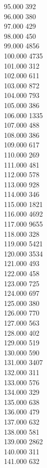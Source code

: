 { 95.000	392 \\
 96.000	380 \\
 97.000	429 \\
 98.000	450 \\
 99.000	4856 \\
 100.000	4735 \\
 101.000	312 \\
 102.000	611 \\
 103.000	872 \\
 104.000	793 \\
 105.000	386 \\
 106.000	1335 \\
 107.000	488 \\
 108.000	386 \\
 109.000	617 \\
 110.000	269 \\
 111.000	481 \\
 112.000	578 \\
 113.000	928 \\
 114.000	346 \\
 115.000	1821 \\
 116.000	4692 \\
 117.000	9655 \\
 118.000	328 \\
 119.000	5421 \\
 120.000	3534 \\
 121.000	493 \\
 122.000	458 \\
 123.000	725 \\
 124.000	697 \\
 125.000	380 \\
 126.000	770 \\
 127.000	563 \\
 128.000	402 \\
 129.000	519 \\
 130.000	590 \\
 131.000	3407 \\
 132.000	311 \\
 133.000	576 \\
 134.000	329 \\
 135.000	638 \\
 136.000	479 \\
 137.000	632 \\
 138.000	581 \\
 139.000	2862 \\
 140.000	311 \\
 141.000	632 \\
}

